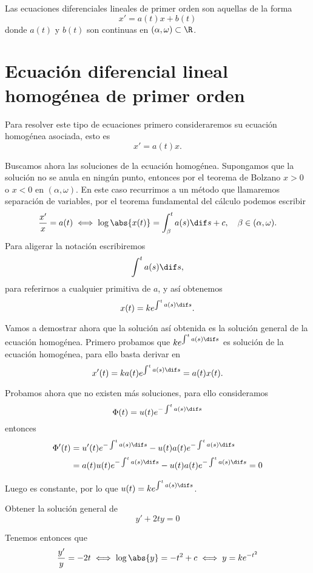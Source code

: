 \documentclass[../main.tex]{subfiles}
\begin{document}
\begin{definition}
Las ecuaciones diferenciales lineales de primer orden son aquellas de la forma
\[x' = a(t)x + b(t)\]
donde \(a(t)\) y \(b(t)\) son continuas en \((\alpha, \omega) \subset \R\).
\end{definition}

\section{Ecuación diferencial lineal homogénea de primer orden}

Para resolver este tipo de ecuaciones primero consideraremos su ecuación
homogénea asociada, esto es
\[x' = a(t)x.\]

Buscamos ahora las soluciones de la ecuación homogénea. Supongamos que la
solución no se anula en ningún punto, entonces por el teorema de Bolzano
\(x > 0\) o \(x < 0\) en \((\alpha, \omega)\). En este caso recurrimos a un
método que llamaremos separación de variables, por el teorema fundamental del
cálculo podemos escribir
\[\frac{x'}{x} = a(t) \iff \log\abs{x(t)} = \int_{\beta}^t a(s) \dif s + c,
	\quad \beta \in (\alpha, \omega).\]
Para aligerar la notación escribiremos
\[\int^t a(s) \dif s,\]
para referirnos a cualquier primitiva de \(a\), y así obtenemos
\[x(t) = k e^{\int^t a(s) \dif s}.\]

Vamos a demostrar ahora que la solución así obtenida es la solución general de
la ecuación homogénea. Primero probamos que \(k e^{\int^t a(s) \dif s}\) es
solución de la ecuación homogénea, para ello basta derivar en
\[x'(t) = k a(t) e^{\int^t a(s) \dif s} = a(t) x(t).\]

Probamos ahora que no existen más soluciones, para ello consideramos
\[\Phi(t) = u(t) e^{-\int^t a(s) \dif s}\]
entonces
\begin{align*}
	\Phi'(t) &= u'(t) e^{-\int^t a(s) \dif s}
		- u(t) a(t) e^{-\int^t a(s) \dif s} \\
		&= a(t) u(t) e^{-\int^t a(s) \dif s} - u(t) a(t) e^{-\int^t a(s) \dif s}
		= 0
\end{align*}

Luego es constante, por lo que \(u(t) = k e^{\int^t a(s) \dif s}\).

\begin{example}
	Obtener la solución general de
	\[y' + 2ty = 0\]
\end{example}

\begin{solution}
	Tenemos entonces que
	\[\frac{y'}{y} = -2t \iff \log\abs{y} = -t^2 + c \iff y = k e^{-t^2}\]
\end{solution}
\end{document}
